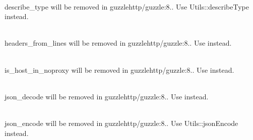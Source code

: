 \begin{DoxyRefList}
\item[Global \doxylink{namespace_guzzle_http_a0b634b074fe1ef82cda43649293f1c9c}{Guzzle\+Http\+::describe\+\_\+type} (\$input)]\hfill \\
\label{deprecated__deprecated000082}%
%
describe\+\_\+type will be removed in guzzlehttp/guzzle\+:8.. Use Utils\+::describe\+Type instead.  
\item[Global \doxylink{namespace_guzzle_http_adf13d6b24a9d274499ba62e96f5a687a}{Guzzle\+Http\+::headers\+\_\+from\+\_\+lines} (iterable \$lines)]\hfill \\
\label{deprecated__deprecated000083}%
%
headers\+\_\+from\+\_\+lines will be removed in guzzlehttp/guzzle\+:8.. Use  instead.  
\item[Global \doxylink{namespace_guzzle_http_a9fe34bb741c9bea9a2bc07707224becb}{Guzzle\+Http\+::is\+\_\+host\+\_\+in\+\_\+noproxy} (string \$host, array \$no\+Proxy\+Array)]\hfill \\
\label{deprecated__deprecated000089}%
%
is\+\_\+host\+\_\+in\+\_\+noproxy will be removed in guzzlehttp/guzzle\+:8.. Use  instead.  
\item[Global \doxylink{namespace_guzzle_http_a876abc2eb3d34a4cfd10abf0f7e3949f}{Guzzle\+Http\+::json\+\_\+decode} (string \$json, bool \$assoc=false, int \$depth=512, int \$options=0)]\hfill \\
\label{deprecated__deprecated000090}%
%
json\+\_\+decode will be removed in guzzlehttp/guzzle\+:8.. Use  instead.  
\item[Global \doxylink{namespace_guzzle_http_a43c0826d27653b8c4cd40d2398f4b93e}{Guzzle\+Http\+::json\+\_\+encode} (\$value, int \$options=0, int \$depth=512)]\hfill \\
\label{deprecated__deprecated000091}%
%
json\+\_\+encode will be removed in guzzlehttp/guzzle\+:8.. Use Utils\+::json\+Encode instead.  
\item[Global \doxylink{namespace_guzzle_http_a03f26690da8f5472df854b872d19c4dd}{Guzzle\+Http\+::normalize\+\_\+header\+\_\+keys} (array \$headers)]\hfill \\

\end{DoxyRefList}

